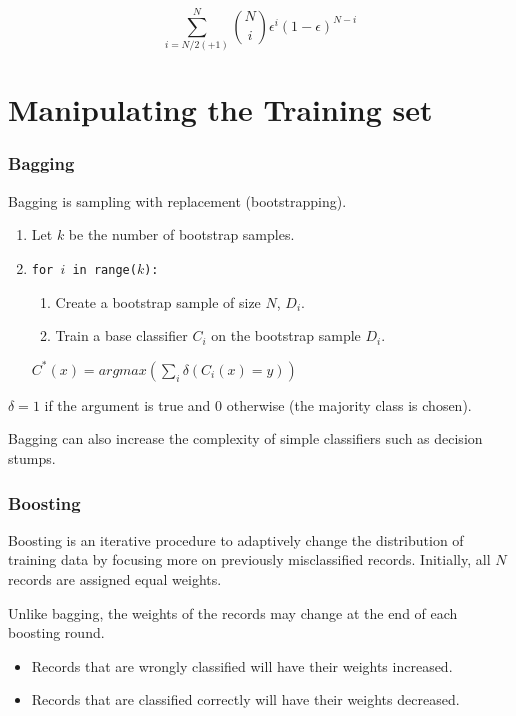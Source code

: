 \begin{equation}
    \sum_{i=N/2(+1)}^N \genfrac(){0pt}{2}{N}{i} \epsilon^i(1-\epsilon)^{N-i}
\end{equation}

\section{Manipulating the Training set}
\subsubsection{Bagging}
Bagging is sampling with replacement (bootstrapping).

\begin{enumerate}
    \item Let $k$ be the number of bootstrap samples.
    \item \texttt{for $i$ in range($k$):}
    \begin{enumerate}
        \item Create a bootstrap sample of size $N$, $D_i$.
        \item Train a base classifier $C_i$ on the bootstrap sample $D_i$.
    \end{enumerate}
    $C^{*}(x) = argmax\left(\sum_i \delta\left(C_i(x)=y\right)\right)$
\end{enumerate}

$\delta = 1$ if the argument is true and $0$ otherwise (the majority class is chosen).

Bagging can also increase the complexity of simple classifiers such as decision stumps.

\newpage
\subsubsection{Boosting}
Boosting is an iterative procedure to adaptively change the distribution of training data by focusing more on previously misclassified records.
Initially, all $N$ records are assigned equal weights.

Unlike bagging, the weights of the records may change at the end of each boosting round.

\begin{itemize}
    \item Records that are wrongly classified will have their weights increased.
    \item Records that are classified correctly will have their weights decreased.
\end{itemize}

